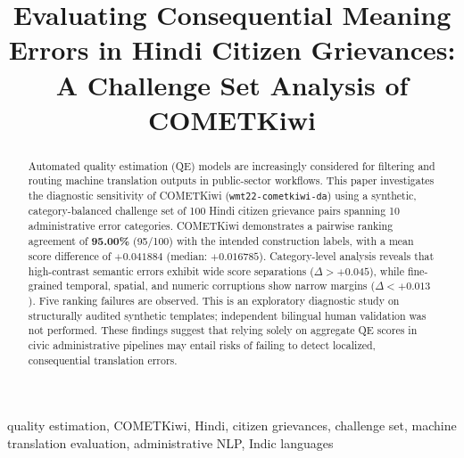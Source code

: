 \documentclass[conference]{IEEEtran}
\begin{document}
\title{Evaluating Consequential Meaning Errors in Hindi Citizen Grievances:\\
A Challenge Set Analysis of COMETKiwi}

\author{%
\and
{}
\and
{}
\and
{}
}

\maketitle

\begin{abstract}
Automated quality estimation (QE) models are increasingly considered for filtering and routing machine translation outputs in public-sector workflows. This paper investigates the diagnostic sensitivity of COMETKiwi (\texttt{wmt22-cometkiwi-da}) using a synthetic, category-balanced challenge set of 100 Hindi citizen grievance pairs spanning 10 administrative error categories. COMETKiwi demonstrates a pairwise ranking agreement of \textbf{95.00\%} (95/100) with the intended construction labels, with a mean score difference of $+0.041884$ (median: $+0.016785$). Category-level analysis reveals that high-contrast semantic errors exhibit wide score separations ($\Delta > +0.045$), while fine-grained temporal, spatial, and numeric corruptions show narrow margins ($\Delta < +0.013$). Five ranking failures are observed. This is an exploratory diagnostic study on structurally audited synthetic templates; independent bilingual human validation was not performed. These findings suggest that relying solely on aggregate QE scores in civic administrative pipelines may entail risks of failing to detect localized, consequential translation errors.
\end{abstract}

\begin{IEEEkeywords}
quality estimation, COMETKiwi, Hindi, citizen grievances, challenge set,
machine translation evaluation, administrative NLP, Indic languages
\end{IEEEkeywords}
\end{document}

